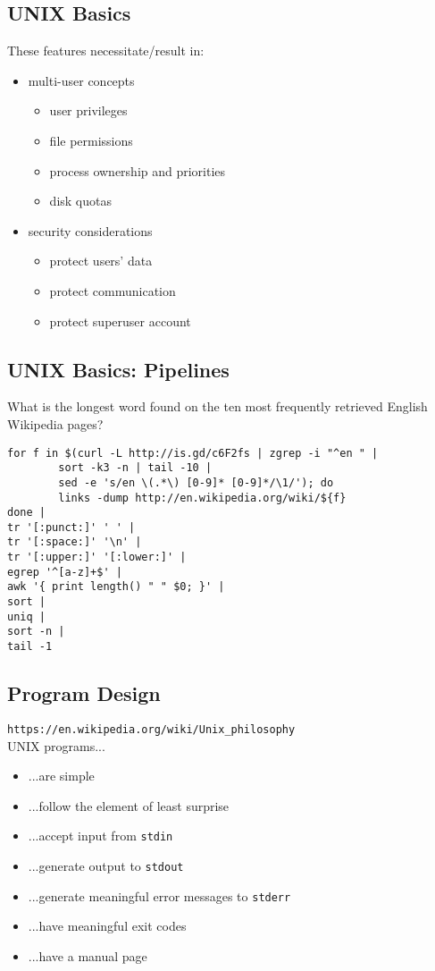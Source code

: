 \documentclass[xga]{xdvislides}
\begin{document}
\subsection{UNIX Basics}
These features necessitate/result in:
\begin{itemize}
	\item multi-user concepts
		\begin{itemize}
			\item user privileges
			\item file permissions
			\item process ownership and priorities
			\item disk quotas
		\end{itemize}
	\item security considerations
		\begin{itemize}
			\item protect users' data
			\item protect communication
			\item protect superuser account
		\end{itemize}
\end{itemize}

\subsection{UNIX Basics: Pipelines}
What is the longest word found on the ten most
frequently retrieved English Wikipedia pages?
\begin{verbatim}
for f in $(curl -L http://is.gd/c6F2fs | zgrep -i "^en " |
        sort -k3 -n | tail -10 |
        sed -e 's/en \(.*\) [0-9]* [0-9]*/\1/'); do
        links -dump http://en.wikipedia.org/wiki/${f}
done |
tr '[:punct:]' ' ' |
tr '[:space:]' '\n' |
tr '[:upper:]' '[:lower:]' |
egrep '^[a-z]+$' |
awk '{ print length() " " $0; }' |
sort |
uniq |
sort -n |
tail -1
\end{verbatim}

\subsection{Program Design}
\verb+https://en.wikipedia.org/wiki/Unix_philosophy+ \\

UNIX programs...
\begin{itemize}
	\item ...are simple
	\item ...follow the element of least surprise
	\item ...accept input from {\tt stdin}
	\item ...generate output to {\tt stdout}
	\item ...generate meaningful error messages to {\tt stderr}
	\item ...have meaningful exit codes
	\item ...have a manual page
\end{itemize}
\end{document}
